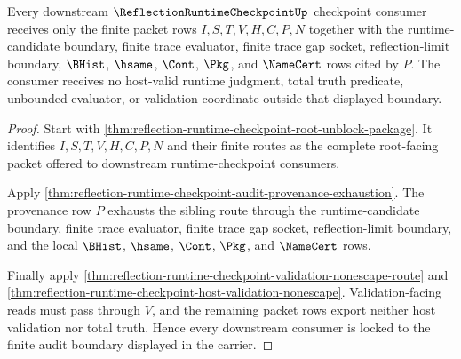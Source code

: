 \begin{theorem}
\label{thm:reflection-runtime-checkpoint-audit-boundary-consumer-lock}
Every downstream $\ReflectionRuntimeCheckpointUp$ checkpoint consumer receives only the finite packet rows $I,S,T,V,H,C,P,N$ together with the runtime-candidate boundary, finite trace evaluator, finite trace gap socket, reflection-limit boundary, $\BHist$, $\hsame$, $\Cont$, $\Pkg$, and $\NameCert$ rows cited by $P$. The consumer receives no host-valid runtime judgment, total truth predicate, unbounded evaluator, or validation coordinate outside that displayed boundary.
\end{theorem}
\begin{proof}
Start with \autoref{thm:reflection-runtime-checkpoint-root-unblock-package}. It identifies $I,S,T,V,H,C,P,N$ and their finite routes as the complete root-facing packet offered to downstream runtime-checkpoint consumers.

Apply \autoref{thm:reflection-runtime-checkpoint-audit-provenance-exhaustion}. The provenance row $P$ exhausts the sibling route through the runtime-candidate boundary, finite trace evaluator, finite trace gap socket, reflection-limit boundary, and the local $\BHist$, $\hsame$, $\Cont$, $\Pkg$, and $\NameCert$ rows.

Finally apply \autoref{thm:reflection-runtime-checkpoint-validation-nonescape-route} and \autoref{thm:reflection-runtime-checkpoint-host-validation-nonescape}. Validation-facing reads must pass through $V$, and the remaining packet rows export neither host validation nor total truth. Hence every downstream consumer is locked to the finite audit boundary displayed in the carrier.
\end{proof}

